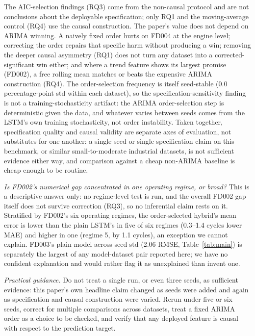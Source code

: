 \documentclass[conference]{IEEEtran}
\begin{document}
The AIC-selection findings (RQ3) come from the non-causal protocol and are not conclusions about the deployable specification; only RQ1 and the moving-average control (RQ4) use the causal construction. The paper's value does not depend on ARIMA winning. A naively fixed order hurts on FD004 at the engine level; correcting the order repairs that specific harm without producing a win; removing the deeper causal asymmetry (RQ1) does not turn any dataset into a corrected-significant win either; and where a trend feature shows its largest promise (FD002), a free rolling mean matches or beats the expensive ARIMA construction (RQ4). The order-selection frequency is itself seed-stable (0.0 percentage-point std within each dataset), so the specification-sensitivity finding is not a training-stochasticity artifact: the ARIMA order-selection step is deterministic given the data, and whatever varies between seeds comes from the LSTM's own training stochasticity, not order instability. Taken together, specification quality and causal validity are separate axes of evaluation, not substitutes for one another: a single-seed or single-specification claim on this benchmark, or similar small-to-moderate industrial datasets, is not sufficient evidence either way, and comparison against a cheap non-ARIMA baseline is cheap enough to be routine.

\emph{Is FD002's numerical gap concentrated in one operating regime, or broad?} This is a descriptive answer only: no regime-level test is run, and the overall FD002 gap itself does not survive correction (RQ3), so no inferential claim rests on it. Stratified by FD002's six operating regimes, the order-selected hybrid's mean error is lower than the plain LSTM's in five of six regimes (0.3--1.4 cycles lower MAE) and higher in one (regime 5, by 1.1 cycles), an exception we cannot explain. FD003's plain-model across-seed std (2.06 RMSE, Table~\ref{tab:main}) is separately the largest of any model-dataset pair reported here; we have no confident explanation and would rather flag it as unexplained than invent one.

\emph{Practical guidance.} Do not treat a single run, or even three seeds, as sufficient evidence: this paper's own headline claim changed as seeds were added and again as specification and causal construction were varied. Rerun under five or six seeds, correct for multiple comparisons across datasets, treat a fixed ARIMA order as a choice to be checked, and verify that any deployed feature is causal with respect to the prediction target.
\end{document}
